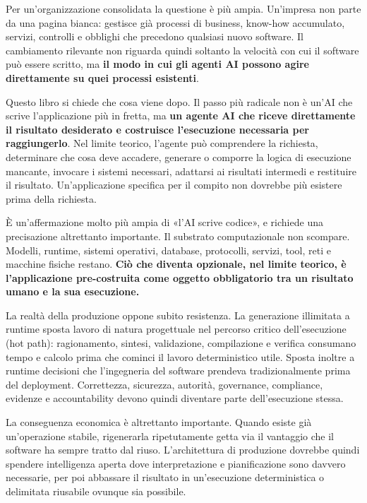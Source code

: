 \documentclass[10pt,oneside,openany]{book}
\begin{document}
Per un'organizzazione consolidata la questione è più ampia. Un'impresa non parte da una pagina bianca: gestisce già processi di business, know-how accumulato, servizi, controlli e obblighi che precedono qualsiasi nuovo software. Il cambiamento rilevante non riguarda quindi soltanto la velocità con cui il software può essere scritto, ma \textbf{il modo in cui gli agenti AI possono agire direttamente su quei processi esistenti}.

Questo libro si chiede che cosa viene dopo. Il passo più radicale non è un'AI che scrive l'applicazione più in fretta, ma \textbf{un agente AI che riceve direttamente il risultato desiderato e costruisce l'esecuzione necessaria per raggiungerlo}. Nel limite teorico, l'agente può comprendere la richiesta, determinare che cosa deve accadere, generare o comporre la logica di esecuzione mancante, invocare i sistemi necessari, adattarsi ai risultati intermedi e restituire il risultato. Un'applicazione specifica per il compito non dovrebbe più esistere prima della richiesta.

È un'affermazione molto più ampia di «l'AI scrive codice», e richiede una precisazione altrettanto importante. Il substrato computazionale non scompare. Modelli, runtime, sistemi operativi, database, protocolli, servizi, tool, reti e macchine fisiche restano. \textbf{Ciò che diventa opzionale, nel limite teorico, è l'applicazione pre-costruita come oggetto obbligatorio tra un risultato umano e la sua esecuzione.}

La realtà della produzione oppone subito resistenza. La generazione illimitata a runtime sposta lavoro di natura progettuale nel percorso critico dell'esecuzione (hot path): ragionamento, sintesi, validazione, compilazione e verifica consumano tempo e calcolo prima che cominci il lavoro deterministico utile. Sposta inoltre a runtime decisioni che l'ingegneria del software prendeva tradizionalmente prima del deployment. Correttezza, sicurezza, autorità, governance, compliance, evidenze e accountability devono quindi diventare parte dell'esecuzione stessa.

La conseguenza economica è altrettanto importante. Quando esiste già un'operazione stabile, rigenerarla ripetutamente getta via il vantaggio che il software ha sempre tratto dal riuso. L'architettura di produzione dovrebbe quindi spendere intelligenza aperta dove interpretazione e pianificazione sono davvero necessarie, per poi abbassare il risultato in un'esecuzione deterministica o delimitata riusabile ovunque sia possibile.
\end{document}
